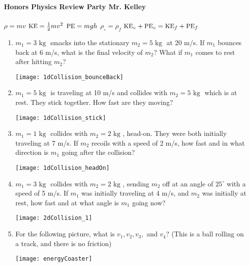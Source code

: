 \documentclass[12pt]{report}
\newcommand{\kg}{\mbox{ kg }}
\newcommand{\ke}{\mbox{\small KE}}
\newcommand{\pe}{\mbox{\small PE}}
\begin{document}
{\bf{Honors Physics} \hfill {Review Party} \hfill {Mr. Kelley}} \\ \\
$\rho=mv$ \hfill $\ke=\frac{1}{2}mv^2$ \hfill $\pe=mgh$ \hfill $\rho_\circ = \rho_f$ \hfill $\ke_\circ + \pe_\circ = \ke_f + \pe_f$


\begin{enumerate}
\item $m_1 = 3 \kg$ smacks into the stationary $m_2 = 5\kg$ at 20 m/s.  If $m_1$ bounces back at 6 m/s, what is the final velocity of $m_2$?  What if $m_1$ comes to rest after hitting $m_2$? \\ \vspace{1cm}

\texttt{[image: 1dCollision\_bounceBack]}
\vspace{.75cm}

\item $m_1 = 5 \kg$ is traveling at 10 m/s and collides with $m_2 = 5 \kg$ which is at rest.  They stick together.  How fast are they moving? \\ \vspace{1cm}

\texttt{[image: 1dCollision\_stick]}
\vspace{.75cm}

\item $m_1 = 1 \kg$ collides with $m_2 = 2 \kg$, head-on.  They were both initially traveling at 7 m/s.  If $m_2$ recoils with a speed of 2 m/s, how fast and in what direction is $m_1$ going after the collision? \\ \vspace{1cm}

\texttt{[image: 1dCollision\_headOn]}
\vspace{.75cm}

\item $m_1 = 3 \kg$ collides with $m_2 = 2 \kg$, sending $m_2$ off at an angle of $25^\circ$ with a speed of 5 m/s.  If $m_1$ was initially traveling at 4 m/s, and $m_2$ was initially at rest, how fast and at what angle is $m_1$ going now? \\ \vspace{1cm}

\texttt{[image: 2dCollision\_1]}
\vspace{.75cm}

\item For the following picture, what is $v_1, v_2, v_3,$ and $v_4$? (This is a ball rolling on a track, and there is no friction)  \\ \vspace{1cm}

\texttt{[image: energyCoaster]}
\vspace{.75cm}


\end{enumerate}
\end{document}
